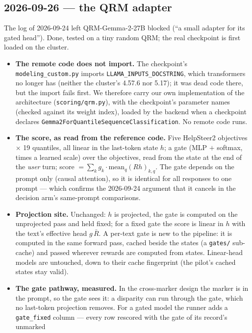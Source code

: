 \documentclass{article}
\begin{document}
\subsection*{2026-09-26 --- the QRM adapter}
The log of 2026-09-24 left QRM-Gemma-2-27B blocked (``a small adapter for its gated head''). Done, tested on a
tiny random QRM; the real checkpoint is first loaded on the cluster.
\begin{itemize}
  \item \textbf{The remote code does not import.} The checkpoint's \texttt{modeling\_custom.py} imports
        \texttt{LLAMA\_INPUTS\_DOCSTRING}, which transformers no longer has (neither the cluster's 4.57.6 nor 5.17);
        it was dead code there, but the import fails first. We therefore carry our own implementation of the
        architecture (\texttt{scoring/qrm.py}), with the checkpoint's parameter names (checked against its weight
        index), loaded by the backend when a checkpoint declares \texttt{Gemma2ForQuantileSequenceClassification}. No
        remote code runs.
  \item \textbf{The score, as read from the reference code.} Five HelpSteer2 objectives $\times$ 19 quantiles, all
        linear in the last-token state $h$; a gate (MLP $+$ softmax, times a learned scale) over the objectives, read
        from the state at the end of the \emph{user} turn; score $=\sum_k g_k \cdot \mathrm{mean}_q (Rh)_{k,q}$. The gate
        depends on the prompt only (causal attention), so it is identical for all responses to one prompt --- which
        confirms the 2026-09-24 argument that it cancels in the decision arm's same-prompt comparisons.
  \item \textbf{Projection site.} Unchanged: $h$ is projected, the gate is computed on the unprojected pass and held
        fixed; for a fixed gate the score is linear in $h$ with the text's effective head $g\,\bar R$. A per-text
        gate is new to the pipeline: it is computed in the same forward pass, cached beside the states (a
        \texttt{gates/} sub-cache) and passed wherever rewards are computed from states. Linear-head models are
        untouched, down to their cache fingerprint (the pilot's cached states stay valid).
  \item \textbf{The gate pathway, measured.} In the cross-marker design the marker is in the prompt, so the gate
        sees it: a disparity can run through the gate, which no last-token projection removes. For a gated model
        the runner adds a \texttt{gate\_fixed} column --- every row rescored with the gate of its record's unmarked

\end{itemize}
\end{document}
